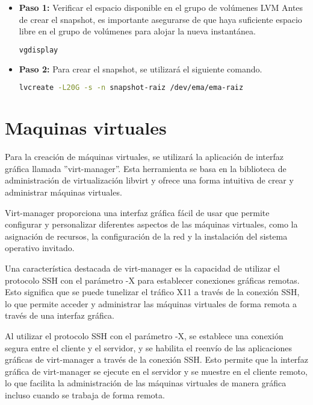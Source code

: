 	\begin{itemize}
		\item \textbf{Paso 1:} Verificar el espacio disponible en el grupo de volúmenes LVM
		Antes de crear el snapshot, es importante asegurarse de que haya suficiente espacio libre en el grupo de volúmenes para alojar la nueva instantánea.
		\begin{lstlisting}[language=Bash, caption=vgdisplay]
		vgdisplay
		\end{lstlisting}
			
		\item\textbf{Paso 2:} Para crear el snapshot, se utilizará el siguiente comando.
		\begin{lstlisting}[language=Bash, caption=snapshot]
		lvcreate -L20G -s -n snapshot-raiz /dev/ema/ema-raiz
		\end{lstlisting}
				
		\end{itemize}

			
		\section{Maquinas virtuales}
		
		Para la creación de máquinas virtuales, se utilizará la aplicación de interfaz gráfica llamada ''virt-manager''. Esta herramienta se basa en la biblioteca de administración de virtualización libvirt y ofrece una forma intuitiva de crear y administrar máquinas virtuales.\par
		
		Virt-manager proporciona una interfaz gráfica fácil de usar que permite configurar y personalizar diferentes aspectos de las máquinas virtuales, como la asignación de recursos, la configuración de la red y la instalación del sistema operativo invitado.\par
		
		Una característica destacada de virt-manager es la capacidad de utilizar el protocolo SSH con el parámetro -X para establecer conexiones gráficas remotas. Esto significa que se puede tunelizar el tráfico X11 a través de la conexión SSH, lo que permite acceder y administrar las máquinas virtuales de forma remota a través de una interfaz gráfica.\par
		
		Al utilizar el protocolo SSH con el parámetro -X, se establece una conexión segura entre el cliente y el servidor, y se habilita el reenvío de las aplicaciones gráficas de virt-manager a través de la conexión SSH. Esto permite que la interfaz gráfica de virt-manager se ejecute en el servidor y se muestre en el cliente remoto, lo que facilita la administración de las máquinas virtuales de manera gráfica incluso cuando se trabaja de forma remota.\par
		
